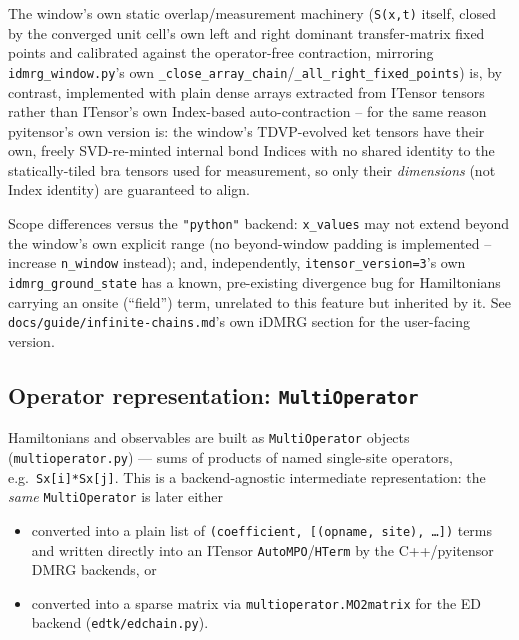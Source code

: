 \documentclass[11pt]{article}
\begin{document}
The window's own static overlap/measurement machinery (\texttt{S(x,t)} itself, closed by
the converged unit cell's own left and right dominant transfer-matrix
fixed points and calibrated against the operator-free contraction,
mirroring \texttt{idmrg\_window.py}'s own
\texttt{\_close\_array\_chain}/\texttt{\_all\_right\_fixed\_points})
is, by contrast, implemented with plain dense arrays extracted from
ITensor tensors rather than ITensor's own Index-based auto-contraction --
for the same reason pyitensor's own version is: the window's
TDVP-evolved ket tensors have their own, freely SVD-re-minted internal
bond Indices with no shared identity to the statically-tiled bra tensors
used for measurement, so only their \emph{dimensions} (not Index
identity) are guaranteed to align.

Scope differences versus the \texttt{"python"} backend:
\texttt{x\_values} may not extend beyond the window's own explicit range
(no beyond-window padding is implemented -- increase \texttt{n\_window}
instead); and, independently, \texttt{itensor\_version=3}'s own
\texttt{idmrg\_ground\_state} has a known, pre-existing divergence bug
for Hamiltonians carrying an onsite (``field'') term, unrelated to this
feature but inherited by it. See \texttt{docs/guide/infinite-chains.md}'s own
iDMRG section for the user-facing version.

\subsection{Operator representation: \texttt{MultiOperator}}

Hamiltonians and observables are built as \texttt{MultiOperator} objects
(\texttt{multioperator.py}) --- sums of products of named single-site
operators, e.g.\ \texttt{Sx[i]*Sx[j]}. This is a backend-agnostic
intermediate representation: the \emph{same} \texttt{MultiOperator} is
later either

\begin{itemize}
  \item converted into a plain list of
    \texttt{(coefficient, [(opname, site), \ldots])} terms and written
    directly into an ITensor \texttt{AutoMPO}/\texttt{HTerm} by the
    C++/pyitensor DMRG backends, or
  \item converted into a sparse matrix via
    \texttt{multioperator.MO2matrix} for the ED backend
    (\texttt{edtk/edchain.py}).
\end{itemize}
\end{document}
